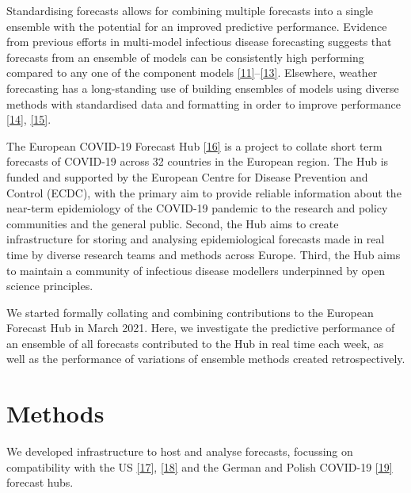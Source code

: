 \documentclass[
]{article}
\begin{document}
Standardising forecasts allows for combining multiple forecasts into a
single ensemble with the potential for an improved predictive
performance. Evidence from previous efforts in multi-model infectious
disease forecasting suggests that forecasts from an ensemble of models
can be consistently high performing compared to any one of the component
models
\protect\hyperlink{ref-reichAccuracyRealtimeMultimodel2019}{{[}11{]}}--\protect\hyperlink{ref-viboudRAPIDDEbolaForecasting2018}{{[}13{]}}.
Elsewhere, weather forecasting has a long-standing use of building
ensembles of models using diverse methods with standardised data and
formatting in order to improve performance
\protect\hyperlink{ref-buizzaIntroductionSpecialIssue2019}{{[}14{]}},
\protect\hyperlink{ref-moranEpidemicForecastingMessier2016}{{[}15{]}}.

The European COVID-19 Forecast Hub
\protect\hyperlink{ref-europeancovid-19forecasthubEuropeanCOVID19Forecast2021}{{[}16{]}}
is a project to collate short term forecasts of COVID-19 across 32
countries in the European region. The Hub is funded and supported by the
European Centre for Disease Prevention and Control (ECDC), with the
primary aim to provide reliable information about the near-term
epidemiology of the COVID-19 pandemic to the research and policy
communities and the general public. Second, the Hub aims to create
infrastructure for storing and analysing epidemiological forecasts made
in real time by diverse research teams and methods across Europe. Third,
the Hub aims to maintain a community of infectious disease modellers
underpinned by open science principles.

We started formally collating and combining contributions to the
European Forecast Hub in March 2021. Here, we investigate the predictive
performance of an ensemble of all forecasts contributed to the Hub in
real time each week, as well as the performance of variations of
ensemble methods created retrospectively.

\hypertarget{methods}{%
\section{Methods}\label{methods}}

We developed infrastructure to host and analyse forecasts, focussing on
compatibility with the US
\protect\hyperlink{ref-cramerReichlabCovid19forecasthubRelease2021}{{[}17{]}},
\protect\hyperlink{ref-wangReichlabCovidHubUtilsRepository2021}{{[}18{]}}
and the German and Polish COVID-19
\protect\hyperlink{ref-bracherGermanPolishCOVID192020}{{[}19{]}}
forecast hubs.
\end{document}
